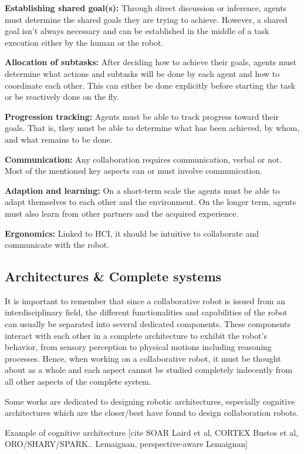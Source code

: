 \textbf{Establishing shared goal(s):} Through direct discussion or inference, agents must determine the shared goals they are trying to achieve. However, a shared goal isn't always necessary and can be established in the middle of a task execution either by the human or the robot.

\textbf{Allocation of subtasks:} After deciding how to achieve their goals, agents must determine what actions and subtasks will be done by each agent and how to coordinate each other. This can either be done explicitly before starting the task or be reactively done on the fly.

\textbf{Progression tracking:} Agents must be able to track progress toward their goals. That is, they must be able to determine what has been achieved, by whom, and what remains to be done. 

\textbf{Communication:} Any collaboration requires communication, verbal or not. Most of the mentioned key aspects can or must involve communication.

\textbf{Adaption and learning:} On a short-term scale the agents must be able to adapt themselves to each other and the environment. On the longer term, agents must also learn from other partners and the acquired experience.

\textbf{Ergonomics:} Linked to HCI, it should be intuitive to collaborate and communicate with the robot. 

\subsection{Architectures \& Complete systems}

It is important to remember that since a collaborative robot is issued from an interdisciplinary field, the different functionalities and capabilities of the robot can usually be separated into several dedicated components. These components interact with each other in a complete architecture to exhibit the robot's behavior, from sensory perception to physical motions including reasoning processes. 
Hence, when working on a collaborative robot, it must be thought about as a whole and each aspect cannot be studied completely indecently from all other aspects of the complete system. 

Some works are dedicated to designing robotic architectures, especially cognitive architectures which are the closer/best have found to design collaboration robots. 

Example of cognitive architecture
[cite SOAR Laird et al, CORTEX Bustos et al, ORO/SHARY/SPARK.. Lemaignan, perspective-aware Lemaignan]

